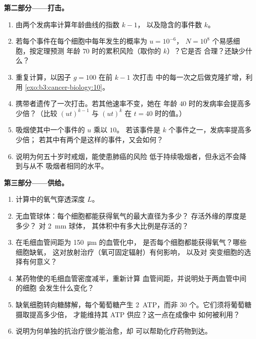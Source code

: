 \begin{problem}
\medskip
\noindent\textbf{第二部分——打击。}
\begin{enumerate}[resume]
  \item 由两个发病率计算年龄曲线的指数 $k - 1$，
        以及隐含的事件数 $k$。
  \item 若每个事件在每个细胞中每年发生的概率为 $u = 10^{-6}$，
        $N = 10^{8}$ 个易感细胞，按定理预测
        年龄 $70$ 时的累积风险（取你的 $k$）？它是否
        合理？还缺少什么？
  \item 重复计算，以因子 $g = 100$ 在前 $k - 1$ 次打击
        中的每一次之后做克隆扩增，利用
        \cref{exo:b3:cancer-biology:10}。
  \item 携带者遗传了一次打击。若其他速率不变，她在
        年龄 $40$ 时的发病率会提高多少倍？（比较
        $(ut)^{k-1}$ 与 $(ut)^{k}$ 在 $t = 40$ 时的值。）
  \item 吸烟使其中一个事件的 $u$ 乘以 $10$。
        若该事件是 $k$ 个事件之一，发病率提高多少倍；
        若其中有两个是这样的事件，又会如何？
  \item 说明为何五十岁时戒烟，能使患肺癌的风险
        低于持续吸烟者，但永远不会降到与从不
        吸烟者相同的水平。
\end{enumerate}

\medskip
\noindent\textbf{第三部分——供给。}
\begin{enumerate}[resume]
  \item 计算中的氧气穿透深度 $L$。
  \item 无血管球体：每个细胞都能获得氧气的最大直径为多少？
        存活外缘的厚度是多少？
        对 \qty{2}{mm} 球体，
        其体积中有多大比例是存活的？
  \item 在毛细血管间距为 \qty{150}{\micro m} 的血管化中，
        是否每个细胞都能获得氧气？哪些细胞缺氧，
        这对放射治疗（氧可固定辐射）有何影响，
        以及对  突变细胞的选择有何意义？
  \item 某药物使的毛细血管密度减半，重新计算
        血管间距，并说明处于两血管中间的细胞
        会发生什么变化？
  \item 缺氧细胞转向糖酵解，每个葡萄糖产生 \qty{2}{ATP}，而非
        $30$ 个。它们须将葡萄糖摄取提高多少倍，
        才能维持其 ATP 供应？这一点在成像中
        如何被利用？
  \item 说明为何单独的抗治疗很少能治愈，却
        可以帮助化疗药物到达。
\end{enumerate}


\end{problem}
